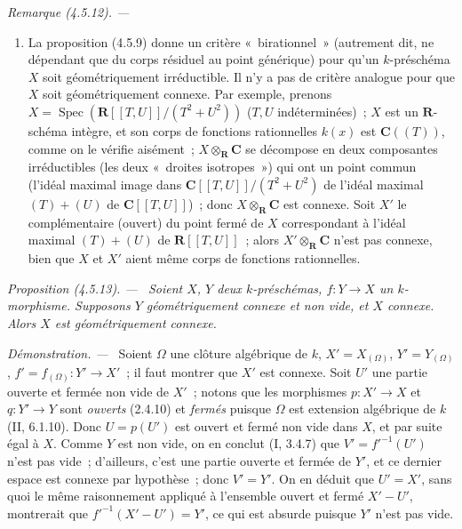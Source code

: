 \documentclass[10pt,oneside]{book}
\newenvironment{proposition}[1][]{%
  \par\medskip\noindent\itshape Proposition (#1). ---\ }{\par}
\newenvironment{remark}[1][]{%
  \par\medskip\noindent\itshape Remarque (#1). ---\ }{\par}
\newenvironment{proof}{%
  \par\medskip\noindent\textit{Démonstration. ---\ }}{\par}
\begin{document}
\begin{remark}[4.5.12]
\begin{enumerate}
\item[(ii)] La proposition (4.5.9) donne un critère «~birationnel~» (autrement
dit, ne dépendant que du corps résiduel au point générique) pour qu'un
$k$-préschéma $X$ soit géométriquement irréductible. Il n'y a pas de critère
analogue pour que $X$ soit géométriquement connexe. Par exemple, prenons
$X=\operatorname{Spec}(\mathbf R[[T,U]]/(T^2+U^2))$ ($T,U$ indéterminées)~;
$X$ est un $\mathbf R$-schéma intègre, et son corps de fonctions rationnelles
$k(x)$ est $\mathbf C((T))$, comme on le vérifie aisément~; $X\otimes_{\mathbf
R}\mathbf C$ se décompose en deux composantes irréductibles (les deux
«~droites isotropes~») qui ont un point commun (l'idéal maximal image dans
$\mathbf C[[T,U]]/(T^2+U^2)$ de l'idéal maximal $(T)+(U)$ de
$\mathbf C[[T,U]]$)~; donc $X\otimes_{\mathbf R}\mathbf C$ est connexe. Soit
$X'$ le complémentaire (ouvert) du point fermé de $X$ correspondant à l'idéal
maximal $(T)+(U)$ de $\mathbf R[[T,U]]$~; alors $X'\otimes_{\mathbf R}\mathbf C$
n'est pas connexe, bien que $X$ et $X'$ aient même corps de fonctions
rationnelles.
\end{enumerate}
\end{remark}

\begin{proposition}[4.5.13]
\label{IV.2.4.5.13-fr}
Soient $X$, $Y$ deux $k$-préschémas, $f:Y\to X$ un $k$-morphisme. Supposons
$Y$ géométriquement connexe et non vide, et $X$ connexe. Alors $X$ est
géométriquement connexe.
\end{proposition}

\begin{proof}
Soient $\Omega$ une clôture algébrique de $k$, $X'=X_{(\Omega)}$,
$Y'=Y_{(\Omega)}$, $f'=f_{(\Omega)}:Y'\to X'$~; il faut montrer que $X'$ est
connexe. Soit $U'$ une partie ouverte et fermée non vide de $X'$~; notons que
les morphismes $p:X'\to X$ et $q:Y'\to Y$ sont \emph{ouverts} (2.4.10) et
\emph{fermés} puisque $\Omega$ est extension algébrique de $k$ (II, 6.1.10).
Donc $U=p(U')$ est ouvert et fermé non vide dans $X$, et par suite égal à $X$.
Comme $Y$ est non vide, on en conclut (I, 3.4.7) que
$V'=f'^{-1}(U')$ n'est pas vide~; d'ailleurs, c'est une partie ouverte et
fermée de $Y'$, et ce dernier espace est connexe par hypothèse~; donc $V'=Y'$.
On en déduit que $U'=X'$, sans quoi le même raisonnement appliqué à l'ensemble
ouvert et fermé $X'-U'$, montrerait que $f'^{-1}(X'-U')=Y'$, ce qui est absurde
puisque $Y'$ n'est pas vide.
\end{proof}
\end{document}
